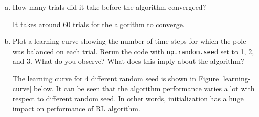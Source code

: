 \documentclass[12pt,letterpaper,boxed]{hmcpset}
\begin{document}
\begin{solution}
  \begin{enumerate}[(a)]
    \item How many trials did it take before the algorithm convergeed?
    
    It takes around 60 trials for the algorithm to converge. 
    
    \item Plot a learning curve showing the number of time-steps for which the pole was balanced on each trial. Rerun the code with \verb|np.random.seed| set to 1, 2, and 3. What do you observe? What does this imply about the algorithm?
    
    The learning curve for 4 different random seed is shown in Figure \ref{learning-curve} below. It can be seen that the algorithm performance varies a lot with respect to different random seed. In other words, initialization has a huge impact on performance of RL algorithm.


\end{enumerate}
\end{solution}
\end{document}
